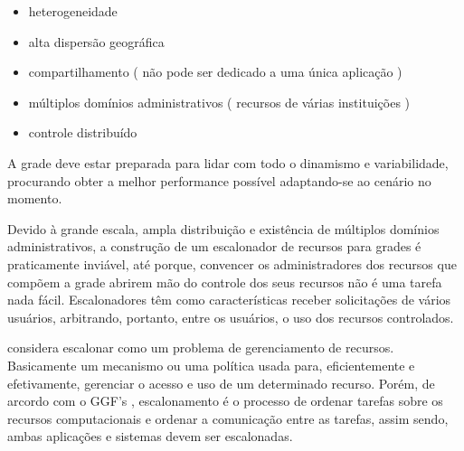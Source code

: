\begin{itemize}
	\item heterogeneidade
	\item alta dispersão geográfica
	\item compartilhamento ( não pode ser dedicado a uma única aplicação )
	\item múltiplos domínios administrativos ( recursos de várias instituições )
	\item controle distribuído 
\end{itemize}

A grade deve estar preparada para lidar com todo o dinamismo e variabilidade, procurando obter a melhor performance possível adaptando-se ao cenário no momento.

Devido à grande escala, ampla distribuição e existência de múltiplos domínios administrativos, a construção de um escalonador de recursos para grades é praticamente inviável, até porque, convencer os administradores dos recursos que compõem a grade abrirem mão do controle dos seus recursos não é uma tarefa nada fácil. Escalonadores têm como características receber solicitações de vários usuários, arbitrando, portanto, entre os usuários, o uso dos recursos controlados.  

\cite{Thomas1996} considera escalonar como um problema de gerenciamento de recursos. Basicamente um mecanismo ou uma política usada para, eficientemente e efetivamente, gerenciar o acesso e uso de um determinado recurso. Porém, de arcordo com o GGF's \cite{M.2002}, escalonamento é o processo de ordenar tarefas sobre os recursos computacionais e ordenar a comunicação entre as tarefas, assim sendo, ambas aplicações e sistemas devem ser escalonadas.
